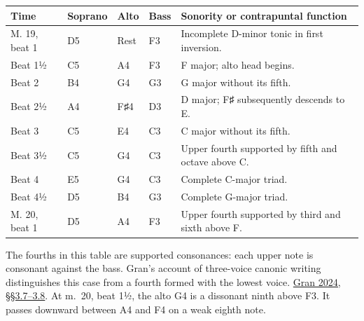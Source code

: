 \documentclass[11pt,a4paper]{article}
\begin{document}
{\def\LTcaptype{table}
\par\addvspace{\LTpre}
{\small\noindent
\begin{tabular}{@{}
  >{\raggedright\arraybackslash}p{}
  >{\raggedright\arraybackslash}p{}
  >{\raggedright\arraybackslash}p{}
  >{\raggedright\arraybackslash}p{}
  >{\raggedright\arraybackslash}p{}@{}}
\toprule\noalign{}
\begin{minipage}[b]{\linewidth}\raggedright
Time
\end{minipage} & \begin{minipage}[b]{\linewidth}\raggedright
Soprano
\end{minipage} & \begin{minipage}[b]{\linewidth}\raggedright
Alto
\end{minipage} & \begin{minipage}[b]{\linewidth}\raggedright
Bass
\end{minipage} & \begin{minipage}[b]{\linewidth}\raggedright
Sonority or contrapuntal function
\end{minipage} \\
\midrule\noalign{}

M. 19, beat 1 & D5 & Rest & F3 & Incomplete D-minor tonic in first inversion. \\
Beat 1½ & C5 & A4 & F3 & F major; alto head begins. \\
Beat 2 & B4 & G4 & G3 & G major without its fifth. \\
Beat 2½ & A4 & F♯4 & D3 & D major; F♯ subsequently descends to E. \\
Beat 3 & C5 & E4 & C3 & C major without its fifth. \\
Beat 3½ & C5 & G4 & C3 & Upper fourth supported by fifth and octave above C. \\
Beat 4 & E5 & G4 & C3 & Complete C-major triad. \\
Beat 4½ & D5 & B4 & G3 & Complete G-major triad. \\
M. 20, beat 1 & D5 & A4 & F3 & Upper fourth supported by third and sixth above F. \\
\bottomrule
\end{tabular}
\par}
\addvspace{\LTpost}
}

The fourths in this table are supported consonances: each upper note is consonant against the bass. Gran's account of three-voice canonic writing distinguishes this case from a fourth formed with the lowest voice. \href{https://mtosmt.org/issues/mto.24.30.2/mto.24.30.2.gran.html}{Gran 2024, §§3.7--3.8}. At m.~20, beat 1½, the alto G4 is a dissonant ninth above F3. It passes downward between A4 and F4 on a weak eighth note.
\end{document}
